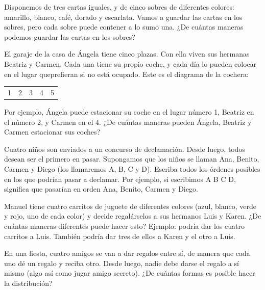 \documentclass[12pt]{article}
\begin{document}
\begin{ejercicio}
    Disponemos de tres cartas iguales, y de cinco sobres de diferentes colores: amarillo, blanco, café, dorado y escarlata. Vamos a guardar las cartas en los sobres, pero cada sobre puede contener a lo sumo una. ¿De cuántas maneras podemos guardar las cartas en los sobres?
\end{ejercicio}

\begin{ejercicio}
    El garaje de la casa de Ángela tiene cinco plazas. Con ella viven sus hermanas Beatriz y Carmen. Cada una tiene su propio coche, y cada día lo pueden colocar en el lugar queprefieran si no está ocupado. Este es el diagrama de la cochera:

    \begin{center}
        \begin{tabular}{|c|c|c|c|c|}
            1 & 2 & 3 & 4 & 5
        \end{tabular}
    \end{center}

    Por ejemplo, Ángela puede estacionar su coche en el lugar número 1, Beatriz en el número 2, y Carmen en el 4. ¿De cuántas maneras pueden Ángela, Beatriz y Carmen estacionar sus coches?
\end{ejercicio}

\begin{ejercicio}
    Cuatro niños son enviados a un concurso de declamación. Desde luego, todos desean ser el primero en pasar. Supongamos que los niños se llaman Ana, Benito, Carmen y Diego (los llamaremos A, B, C y D). Escriba todos los órdenes posibles en los que podrían pasar a declamar. Por ejemplo, si escribimos A B C D, significa que pasarían en orden Ana, Benito, Carmen y Diego.
\end{ejercicio}

\begin{ejercicio}
    Manuel tiene cuatro carritos de juguete de diferentes colores (azul, blanco, verde y rojo, uno de cada color) y decide regalárselos a sus hermanos Luis y Karen. ¿De cuántas maneras diferentes puede hacer esto? Ejemplo: podría dar los cuatro carritos a Luis. También podría dar tres de ellos a Karen y el otro a Luis.
\end{ejercicio}

\begin{ejercicio}
    En una fiesta, cuatro amigos se van a dar regalos entre sí, de manera que cada uno dé un regalo y reciba otro. Desde luego, nadie debe darse el regalo a sí mismo (algo así como jugar amigo secreto). ¿De cuántas formas es posible hacer la distribución?
\end{ejercicio}
\end{document}
